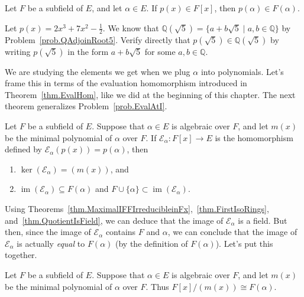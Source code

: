 \begin{theorem}
Let $F$ be a subfield of $E$, and let $\alpha\in E$. If $p(x)\in F[x]$, then $p(\alpha) \in F(\alpha)$.
\end{theorem}

\begin{problem}
Let $p(x) = 2x^3+7x^2-\frac{1}{2}$. We know that $\mathbb{Q}(\sqrt{5}) = \{a+b\sqrt{5}\mid a,b\in \mathbb{Q}\}$ by  Problem~\ref{prob.QAdjoinRoot5}. Verify directly that $p(\sqrt{5}) \in \mathbb{Q}(\sqrt{5})$ by writing $p(\sqrt{5})$ in the form $a+b\sqrt{5}$ for some $a,b\in \mathbb{Q}$.
\end{problem}

We are studying the elements we get when we plug $\alpha$ into polynomials. Let's frame this in terms of the evaluation homomorphism introduced in Theorem~\ref{thm.EvalHom}, like we did at the beginning of this chapter. The next theorem generalizes Problem~\ref{prob.EvalAtI}.

\begin{theorem}
Let $F$ be a subfield of $E$. Suppose that $\alpha\in E$ is algebraic over $F$, and let $m(x)$ be the minimal polynomial of $\alpha$ over $F$. If $\mathcal{E}_\alpha:F[x] \rightarrow E$ is the homomorphism defined by $\mathcal{E}_\alpha(p(x)) = p(\alpha)$, then 
\begin{enumerate}
\item $\ker\left(\mathcal{E}_\alpha\right)=(m(x))$, and
\item $\operatorname{im}\left(\mathcal{E}_\alpha\right)\subseteq F(\alpha)$ and $F\cup\{\alpha\}\subset \operatorname{im}\left(\mathcal{E}_\alpha\right)$.
\end{enumerate}
\end{theorem}

Using Theorems~\ref{thm.MaximalIFFIrreducibleinFx},~\ref{thm.FirstIsoRings}, and~\ref{thm.QuotientIsField}, we can deduce that the image of $\mathcal{E}_\alpha$ is a field. But then, since the image of $\mathcal{E}_\alpha$ contains $F$ and $\alpha$, we can conclude that the image of $\mathcal{E}_\alpha$ is actually \emph{equal} to $F(\alpha)$ (by the definition of $F(\alpha)$). Let's put this together.

\begin{theorem}
Let $F$ be a subfield of $E$. Suppose that $\alpha\in E$ is algebraic over $F$, and let $m(x)$ be the minimal polynomial of $\alpha$ over $F$. 
 Thus $F[x]/(m(x)) \cong F(\alpha)$.
\end{theorem}

